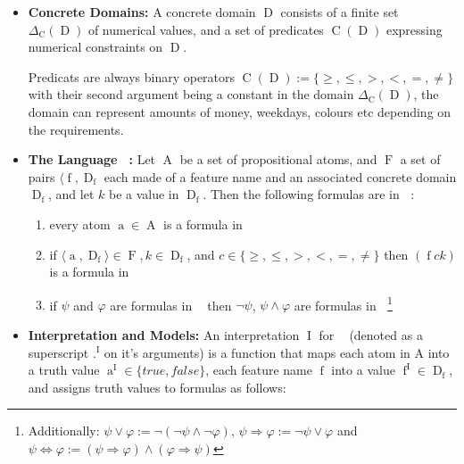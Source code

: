 \documentclass[12pt,msc,a4paper,oneside]{ucl_thesis}
\DeclareMathOperator{\Proplang}{\mathcal{L}(N)}
\DeclareMathOperator{\Propatom}{A}
\DeclareMathOperator{\propatom}{a}
\DeclareMathOperator{\Propvar}{F}
\DeclareMathOperator{\propvar}{f}
\DeclareMathOperator{\Propdom}{D}
\DeclareMathOperator{\Predicate}{C}
\DeclareMathOperator{\Interpretation}{I}
\begin{document}
\begin{itemize}
    \item
        \textbf{Concrete Domains:}\cite{Baader:1991:SIC:1631171.1631239} A concrete domain $\Propdom$ consists of a finite set $\Delta_{\Predicate}(\Propdom)$ of numerical values, and a set of predicates $\Predicate(\Propdom)$ expressing numerical constraints on $\Propdom$.
   
        Predicats are always binary operators $\Predicate(\Propdom) := \{\geq, \leq, >, <, =, \neq\}$ with their second argument being a constant in the domain $\Delta_{\Predicate}(\Propdom)$, the domain can represent amounts of money, weekdays, colours etc depending on the requirements\cite{Ragone2008}.
        
    \item
        \textbf{The Language $\Proplang$:}\cite{Ragone2008} Let $\Propatom$ be a set of propositional atoms, and $\Propvar$ a set of pairs $\langle\propvar, \Propdom_{\propvar}$ each made of a feature name and an associated concrete domain $\Propdom_{\propvar}$, and let $k$ be a value in $\Propdom_{\propvar}$. Then the following formulas are in $\Proplang$:
        \begin{enumerate}
            \item every atom $\propatom \in \Propatom$ is a formula in $\Proplang$
            \item if $\langle \propatom, \Propdom_{\propvar} \rangle \in \Propvar, k \in \Propdom_{\propvar}$, and $c \in \{\geq, \leq, >, <, =, \neq\}$ then $(\propvar ck)$ is a formula in $\Proplang$
            \item if $\psi$ and $\varphi$ are formulas in $\Proplang$ then $\neg\psi$, $\psi \wedge \varphi$ are formulas in $\Proplang$\footnote{Additionally: $\psi \vee \varphi := \neg(\neg\psi\wedge\neg\varphi)$, $\psi\Rightarrow\varphi := \neg\psi\vee\varphi$ and $\psi\Leftrightarrow\varphi := (\psi\Rightarrow\varphi)\wedge(\varphi\Rightarrow\psi)$}
        \end{enumerate}

    \item
        \textbf{Interpretation and Models:}\cite{Ragone2008} An interpretation $\Interpretation$ for $\Proplang$ (denoted as a superscript .$^{\Interpretation}$ on it's arguments) is a function that maps each atom in A into a truth value $\propatom^{\Interpretation} \in \{true, false\}$, each feature name $\propvar$ into a value $\propvar^{\Interpretation} \in \Propdom_{\propvar}$, and assigns truth values to formulas as follows:
       

\end{itemize}
\end{document}
